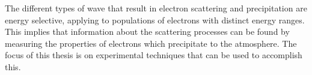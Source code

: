 The different types of wave that result in electron scattering and precipitation are energy selective, applying to populations of electrons with distinct energy ranges. This implies that information about the scattering processes can be found by measuring the properties of electrons which precipitate to the atmosphere. The focus of this thesis is on experimental techniques that can be used to accomplish this.

